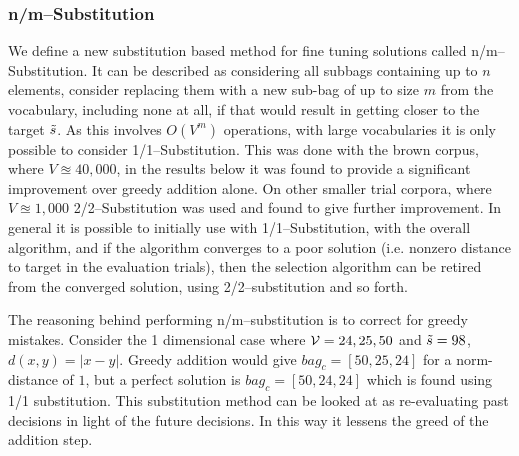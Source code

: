 \documentclass[11pt]{article}
\theoremstyle{plain}
\theoremstyle{definition}
\DeclareMathOperator*{\argmin}{argmin}
\begin{document}
\subsubsection{n/m--Substitution}
We define a new substitution based method for fine tuning solutions called n/m--Substitution. It can be described as considering all subbags containing up to $n$ elements, consider replacing them with a new sub-bag of up to size $m$ from the vocabulary, including none at all, if that would result in getting closer to the target $\tilde{s}$. As this involves $O(V^m)$ operations, with large vocabularies it is only possible to consider 1/1--Substitution. This was done with the brown corpus, where $V\approxeq 40,000$, in the results below it was found to provide a significant improvement over greedy addition alone. On other smaller trial corpora, where $V\approxeq 1,000$ 2/2--Substitution was used and found to give further improvement. In general it is possible to initially use with 1/1--Substitution, with the overall algorithm, and if the algorithm converges to a poor solution (i.e. nonzero distance to target in the evaluation trials), then the selection algorithm can be retired from the converged solution, using 2/2--substitution and so forth.

The reasoning behind performing n/m--substitution is to correct for greedy mistakes. Consider the 1 dimensional case where $\mathcal{V}={24,25,50}$ and $\tilde{s}=98$, $d(x,y)=\left|x-y\right|$. Greedy addition would give  $bag_c=[50,25,24]$ for a norm-distance of $1$, but a perfect solution  is $bag_c=[50,24,24]$ which is found using 1/1 substitution. This substitution method can be looked at as re-evaluating past decisions in light of the future decisions. In this way it lessens the greed of the addition step. 

\end{document}
